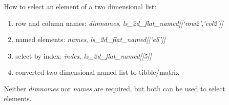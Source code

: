 \documentclass[
]{book}
\providecommand{\tightlist}{%
  \setlength{\itemsep}{0pt}\setlength{\parskip}{0pt}}
\begin{document}
How to select an element of a two dimensional list:

\begin{enumerate}
\def\labelenumi{\arabic{enumi}.}
\tightlist
\item
  row and column names: \emph{dimnames}, \emph{ls\_2d\_flat\_named{[}{[}`row2',`col2'{]}{]}}
\item
  named elements: \emph{names}, \emph{ls\_2d\_flat\_named{[}{[}`e5'{]}{]}}
\item
  select by index: \emph{index}, \emph{ls\_2d\_flat\_named{[}{[}5{]}{]}}
\item
  converted two dimensional named list to tibble/matrix
\end{enumerate}

Neither \emph{dimnames} nor \emph{names} are required, but both can be used to select elements.
\end{document}
